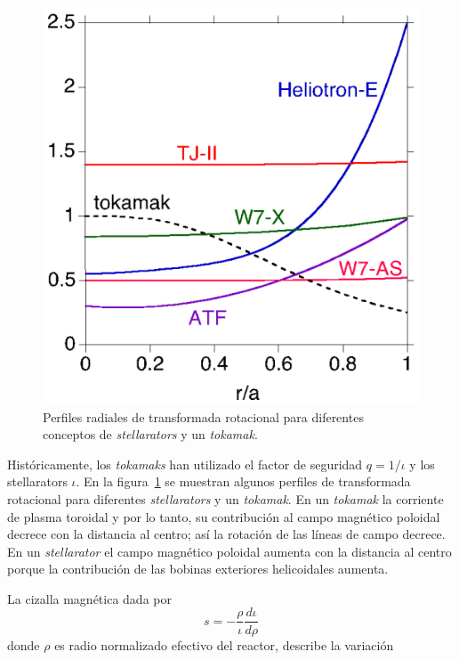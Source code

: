 \begin{figure}
    \centering
    \includegraphics[scale=0.5]{img/compare.png}
    \caption[Perfiles radiales de transformada rotacional]{Perfiles radiales de transformada rotacional para diferentes
    conceptos de \textit{stellarators} y un \textit{tokamak}.}
    \label{fig:compare}
\end{figure}
Históricamente, los \textit{tokamaks} han utilizado el factor de seguridad $q=1/\iota$ y los stellarators $\iota$. En la figura~\ref{fig:compare} se muestran algunos perfiles de
transformada rotacional para diferentes \textit{stellarators} y un \textit{tokamak}. En un
\textit{tokamak} la corriente de plasma toroidal y por lo tanto, su contribución al 
campo magnético poloidal decrece con la distancia al centro; así la rotación
de las líneas de campo decrece. En un \textit{stellarator} el campo magnético poloidal
aumenta con la distancia al centro porque la contribución de las bobinas
exteriores helicoidales aumenta.\par
La cizalla magnética dada por 
\begin{equation}\label{eq:cizalla}
    s=-\frac{\rho}{\iota}\frac{d\iota}{d\rho}
\end{equation}
donde $\rho$ es radio normalizado efectivo del reactor, describe la variación
